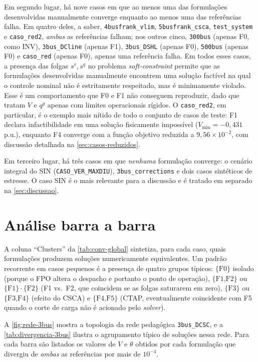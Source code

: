 Em segundo lugar, há nove casos em que ao menos uma das formulações desenvolvidas manualmente converge enquanto ao menos uma das referências falha. Em quatro deles, a saber, \texttt{4busfrank\_vlim}, \texttt{5busfrank\_csca}, \texttt{test\_system} e \texttt{caso\_red2}, \emph{ambas} as referências falham; nos outros cinco, \texttt{300bus} (apenas F0, como INV), \texttt{3bus\_DCline} (apenas F1), \texttt{3bus\_DSHL} (apenas F0), \texttt{500bus} (apenas F0) e \texttt{caso\_red} (apenas F0), apenas uma referência falha. Em todos esses casos, a presença das folgas $s^v, s^q$ no problema \textit{soft-constraint} permite que as formulações desenvolvidas manualmente encontrem uma solução factível na qual o controle nominal não é estritamente respeitado, mas é minimamente violado. Esse é um comportamento que F0 e F1 não conseguem reproduzir, dado que tratam $V$ e $q^g$ apenas com limites operacionais rígidos. O \texttt{caso\_red2}, em particular, é o exemplo mais nítido de todo o conjunto de casos de teste: F1 declara infactibilidade em uma solução fisicamente impossível ($V_{\min} = -0{,}431$\,p.u.), enquanto F4 converge com a função objetivo reduzida a $9{,}56 \times 10^{-2}$, com discussão detalhada na \autoref{sec:casos-reduzidos}.

Em terceiro lugar, há três casos em que \emph{nenhuma} formulação converge: o cenário integral do SIN (\texttt{CASO\_VER\_MAXDIU}), \texttt{3bus\_corrections} e dois casos sintéticos de estresse. O caso SIN é o mais relevante para a discussão e é tratado em separado na \autoref{sec:discussao}.

\section{Análise barra a barra}
\label{sec:analise-barra-barra}

A coluna ``Clusters'' da \autoref{tab:conv-global} sintetiza, para cada caso, quais formulações produzem soluções numericamente equivalentes. Um padrão recorrente em casos pequenos é a presença de quatro grupos típicos: $\{\text{F0}\}$ isolado (porque o FPO altera o despacho e portanto o ponto de operação), $\{\text{F1,F2}\}$ ou $\{\text{F1}\}\cdot\{\text{F2}\}$ (F1 vs.\ F2, que coincidem se as folgas saturarem em zero), $\{\text{F3}\}$ ou $\{\text{F3,F4}\}$ (efeito do CSCA) e $\{\text{F4,F5}\}$ (CTAP, eventualmente coincidente com F5 quando o corte de carga não é acionado pelo \textit{solver}).

A \autoref{fig:rede-3bus} mostra a topologia da rede pedagógica \texttt{3bus\_DCSC}, e a \autoref{tab:divergencia-3bus} ilustra o agrupamento típico de soluções nessa rede. Para cada barra são listados os valores de $V$ e $\theta$ obtidos por cada formulação que divergiu de \emph{ambas} as referências por mais de $10^{-4}$.

